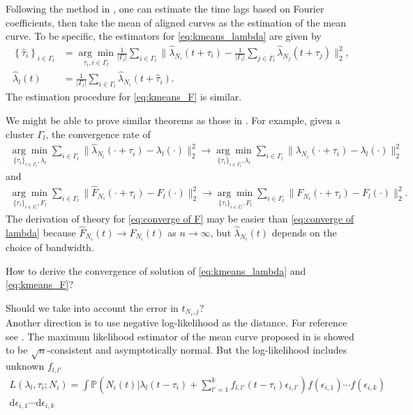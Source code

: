 			Following the method in \cite{Bigot2013}, one can estimate the time lags based on Fourier coefficients, then take the mean of aligned curves as the estimation of the mean curve. To be specific, the estimators for \eqref{eq:kmeans_lambda} are given by 
			\begin{align*}
			\left\{ \hat\tau_i \right\}_{i\in\Gamma_l} &=\underset{\tau_i,i\in\Gamma_l}{\arg\min}\frac{1}{|\Gamma_l|}\sum_{i\in\Gamma_l}\Big\| \hat \lambda_{N_i}(t+\tau_i)- \frac{1}{|\Gamma_l|}\sum_{j\in\Gamma_l}\hat\lambda_{N_j}(t+\tau_j)\Big\|_2^2,\\
			\hat\lambda_l(t) &= \frac{1}{|\Gamma_l|}\sum_{i\in\Gamma_l}\hat\lambda_{N_i}(t+\hat\tau_i).
			\end{align*}
			The estimation procedure for \eqref{eq:kmeans_F} is similar.
			
			We might be able to prove similar theorems as those in \citet{Bigot2013}. For example, given a cluster $\Gamma_l$, the convergence rate of
			\begin{align}\label{eq:converge of lambda}
			\underset{\{\tau_i\}_{i\in\Gamma_l},\lambda_l}{\arg\min} \sum_{i\in\Gamma_l} \|\hat\lambda_{N_i}(\cdot+\tau_i)- \lambda_l(\cdot)\|_2^2 \to \underset{\{\tau_i\}_{i\in\Gamma_l},\lambda_l}{\arg\min} \sum_{i\in\Gamma_l} \|\lambda_{N_i}(\cdot+\tau_i)- \lambda_l(\cdot)\|_2^2
			\end{align} 
			and 
			\begin{align}\label{eq:converge of F}
			\underset{\{\tau_i\}_{i\in\Gamma_l},F_l}{\arg\min} \sum_{i\in\Gamma_l} \|\hat F_{N_i}(\cdot+\tau_i)- F_l(\cdot)\|_2^2 \to \underset{\{\tau_i\}_{i\in\Gamma_l},F_l}{\arg\min} \sum_{i\in\Gamma_l} \|F_{N_i}(\cdot+\tau_i)- F_l(\cdot)\|_2^2.
			\end{align}
			The derivation of theory for \eqref{eq:converge of F} may be easier than \eqref{eq:converge of lambda} because $\hat F_{N_i}(t)\to F_{N_i}(t)$ as $n\to\infty$, but $\hat\lambda_{N_i}(t)$ depends on the choice of bandwidth.

			{\color{red} How to derive the convergence of solution of \eqref{eq:kmeans_lambda} and \eqref{eq:kmeans_F}?}
			
			

			{\color{red} Should we take into account the error in $t_{N_i,j}$?}\\
			

			
			
			

			
			Another direction is to use negative log-likelihood as the distance.
			For reference see \cite{Vimond2010,Gamboa2007,Ronn2009,Gervini2005}.
			The maximum likelihood estimator of the mean curve proposed in \citet{Gervini2005} is showed to be $\sqrt{n}$-consistent and asymptotically normal. %
			{\color {red} But the log-likelihood includes unknown $f_{l,l'}$}
			\begin{align*}
			L(\lambda_{l},\tau_i;N_i)=\int \mathbb{P}\left( N_i(t)\Big| \lambda_{l}(t-\tau_i)+\sum_{l'=1}^k f_{l,l'}(t-\tau_i)\epsilon_{i,l'} \right) f(\epsilon_{i,1})\cdots f(\epsilon_{i,k})\\\text{d}\epsilon_{i,1}\cdots \text{d}\epsilon_{i,k}
			\end{align*}
			

